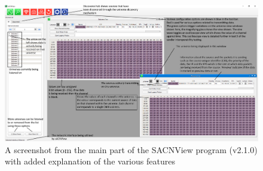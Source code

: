 \documentclass[11pt,a4paper]{article}
\begin{document}
\begin{figure}
	\includegraphics[width=\textwidth]{sacnViewExplained}
	\caption{A screenshot from the main part of the SACNView program (v2.1.0) with added explanation of the various features}
	\label{SACN_VIEW_EXPLAINED}
\end{figure}
\end{document}
